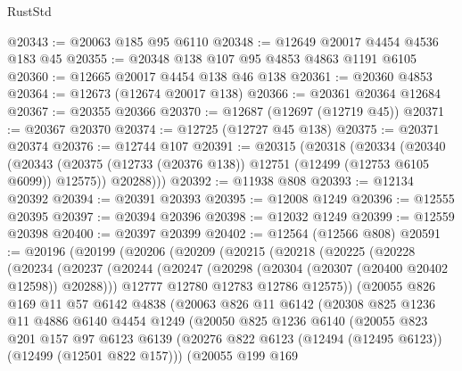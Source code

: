 \begin{lexlean}{RustStd}
\begin{coremodule}
{\begin{coremodule}
{{{{{{{{{{{{{{{{{{{{{{{{{{{{{{{{{{{{{{{{{{{{{{{{{{{{{{{{{{{{{{{{{{{{{{{{{{{{{{{{@20343 := @20063 @185 @95 @6110
@20348 := @12649 @20017 @4454 @4536 @183 @45
@20355 := @20348 @138 @107 @95 @4853 @4863 @1191 @6105
@20360 := @12665 @20017 @4454 @138 @46 @138
@20361 := @20360 @4853
@20364 := @12673 (@12674 @20017 @138)
@20366 := @20361 @20364 @12684
@20367 := @20355 @20366
@20370 := @12687 (@12697 (@12719 @45))
@20371 := @20367 @20370
@20374 := @12725 (@12727 @45 @138)
@20375 := @20371 @20374
@20376 := @12744 @107
@20391 := @20315
    (@20318
      (@20334
        (@20340
          (@20343 (@20375 (@12733 (@20376 @138)) @12751 (@12499 (@12753 @6105 @6099)) @12575))
          @20288)))
@20392 := @11938 @808
@20393 := @12134 @20392
@20394 := @20391 @20393
@20395 := @12008 @1249
@20396 := @12555 @20395
@20397 := @20394 @20396
@20398 := @12032 @1249
@20399 := @12559 @20398
@20400 := @20397 @20399
@20402 := @12564 (@12566 @808)
@20591 := @20196
    (@20199
      (@20206
        (@20209
          (@20215
            (@20218
              (@20225
                (@20228
                  (@20234
                    (@20237
                      (@20244
                        (@20247 (@20298 (@20304 (@20307 (@20400 @20402 @12598)) @20288)))
                        @12777
                        @12780
                        @12783
                        @12786
                        @12575))
                    (@20055
                      @826
                      @169
                      @11
                      @57
                      @6142
                      @4838
                      (@20063
                        @826
                        @11
                        @6142
                        (@20308
                          @825
                          @1236
                          @11
                          @4886
                          @6140
                          @4454
                          @1249
                          (@20050
                            @825
                            @1236
                            @6140
                            (@20055
                              @823
                              @201
                              @157
                              @97
                              @6123
                              @6139
                              (@20276
                                @822
                                @6123
                                (@12494 (@12495 @6123))
                                (@12499 (@12501 @822 @157)))
                              (@20055
                                @199
                                @169
}}}}}}}}}}}}}}}}}}}}}}}}}}}}}}}}}}}}}}}}}}}}}}}}}}}}}}}}}}}}}}}}}}}}}}}}}}}}}}}}
\end{coremodule}}
\end{coremodule}
\end{lexlean}
